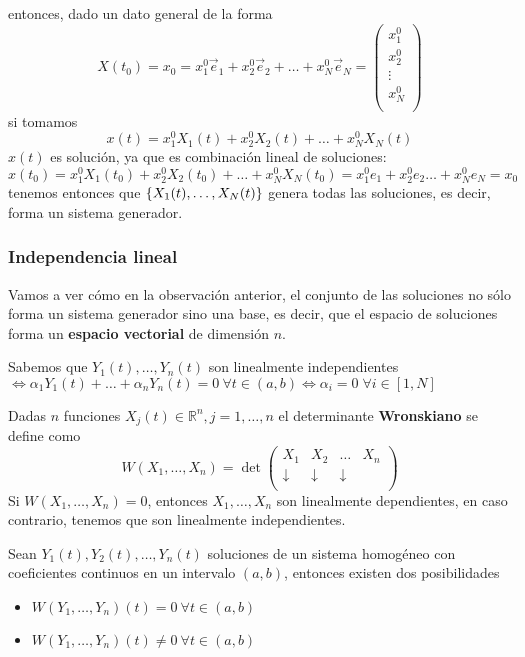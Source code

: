 \noindent entonces, dado un dato general de la forma $$X(t_0) = x_0 = x_1^0\vec{e}_1 + x_2^0\vec{e}_2+\hdots+x_N^0\vec{e}_N = \begin{pmatrix}
x_1^0\\
x_2^0\\
\vdots\\
x_N^0\\
\end{pmatrix}$$
si tomamos $$x(t) = x_1^0X_1(t)+x_2^0X_2(t)+\hdots +x_N^0X_N(t)$$ $x(t)$ es solución, ya que es combinación lineal de soluciones:
$$x(t_0) = x_1^0X_1(t_0)+x_2^0X_2(t_0)+\hdots+x_N^0X_N(t_0) = x_1^0e_1+x_2^0e_2\hdots+x_N^0e_N = x_0$$
tenemos entonces que $\{ X_1(t),\hdots,X_N(t) \}$ genera todas las soluciones, es decir, forma un sistema generador.

\subsubsection{Independencia lineal}
Vamos a ver cómo en la observación anterior, el conjunto de las soluciones no sólo forma un sistema generador sino una base, es decir, que el espacio de soluciones forma un \textbf{espacio vectorial} de dimensión $n$.

Sabemos que 
$Y_1(t), \dotsc, Y_n(t) $ son linealmente independientes $ \iff \alpha_1 Y_1(t)+\hdots+\alpha_n Y_n(t) = 0\ \forall t \in (a, b) \iff \alpha_i = 0\; ∀ i ∈ [1,N]$

\begin{definition}
Dadas $n$ funciones $X_j(t) \in ℝ^n, j=1,\dotsc,n$ el determinante \textbf{Wronskiano} se define como
$$W(X_1, \hdots, X_n) = \det 
\begin{pmatrix}
X_1 & X_2 & \hdots & X_n\\
\downarrow & \downarrow & \downarrow \\
\end{pmatrix}$$
Si $W(X_1, \hdots, X_n) = 0$, entonces $X_1, \hdots, X_n$ son linealmente dependientes, en caso contrario, tenemos que son linealmente independientes.
\end{definition}

\begin{theorem}
Sean $Y_1(t), Y_2(t), \hdots, Y_n(t)$ soluciones de un sistema homogéneo con coeficientes continuos en un intervalo $(a,b)$, entonces existen dos posibilidades
\begin{itemize}
\item $W(Y_1, \hdots, Y_n)(t) = 0\ \forall t \in (a, b)$
\item $W(Y_1, \hdots, Y_n)(t) \neq 0\ \forall t \in (a, b)$
\end{itemize}
\end{theorem}

